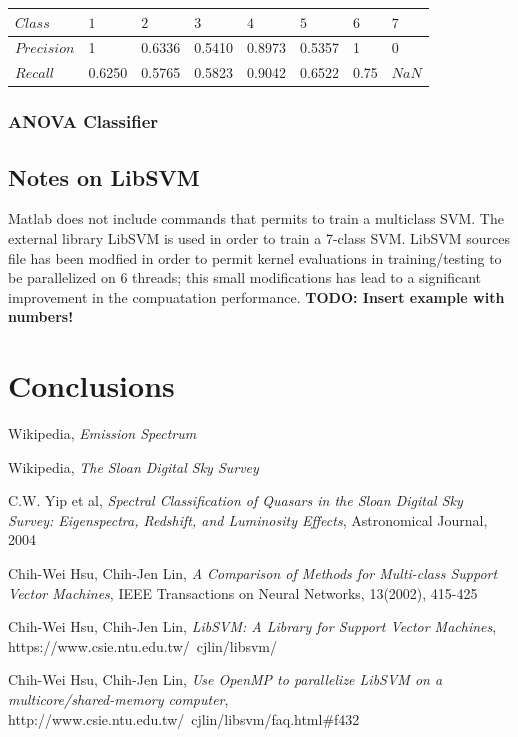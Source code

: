 \documentclass[a4paper,10pt]{article}
\begin{document}
      \begin{table}[H]
      	\centering
	\begin{tabular}{l|P{1cm}P{1cm}P{1cm}P{1cm}P{1cm}P{1cm}P{1cm}} \toprule
	  {$Class$} & {$1$} & {$2$} & {$3$} & {$4$} & {$5$} & {$6$} & {$7$} \\ \midrule
	  $Precision$  & 1 & 0.6336 & 0.5410 & 0.8973 & 0.5357 & 1 & 0 \\ \midrule
	  $Recall$  & 0.6250 & 0.5765 & 0.5823 & 0.9042 & 0.6522 & 0.75  & $NaN$  \\ \bottomrule
	\end{tabular}
      \end{table}
    
    \subsubsection{ANOVA Classifier}

  \subsection{Notes on LibSVM}
    Matlab does not include commands that permits to train a multiclass SVM. The external library LibSVM \cite{libsvm} is used in order
    to train a 7-class SVM. LibSVM sources file has been modfied \cite{openmpsvm} in order to permit kernel evaluations in training/testing
    to be parallelized on 6 threads; this small modifications has lead to a significant improvement in the compuatation performance.\newline
    \textbf{TODO: Insert example with numbers!}
    
\newpage

\section{Conclusions}

\newpage

\begin{thebibliography}{9}
    Wikipedia,
    \emph{Emission Spectrum}
    
    Wikipedia,
    \emph{The Sloan Digital Sky Survey}
    
    C.W. Yip et al,
    \emph{Spectral Classification of Quasars in the Sloan Digital Sky Survey: Eigenspectra, Redshift, and Luminosity Effects},
    Astronomical Journal,
    2004
    
    Chih-Wei Hsu, Chih-Jen Lin,
    \emph{A Comparison of Methods for Multi-class Support Vector Machines},
    IEEE Transactions on Neural Networks, 13(2002), 415-425
    
    Chih-Wei Hsu, Chih-Jen Lin,
    \emph{LibSVM: A Library for Support Vector Machines},
    https://www.csie.ntu.edu.tw/~cjlin/libsvm/
    
    Chih-Wei Hsu, Chih-Jen Lin,
    \emph{Use OpenMP to parallelize LibSVM on a multicore/shared-memory computer},
    http://www.csie.ntu.edu.tw/~cjlin/libsvm/faq.html\#f432
\end{thebibliography}
\end{document}
